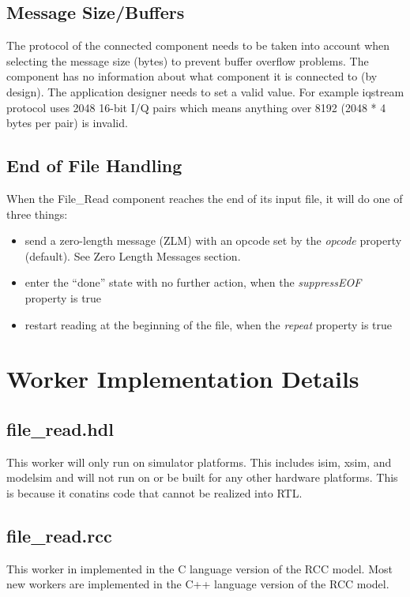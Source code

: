 \documentclass{article}
\def\comp{file\_read}
\begin{document}
\begin{flushleft}
\subsection*{Message Size/Buffers}
The protocol of the connected component needs to be taken into account when selecting the message size (bytes) to prevent buffer overflow problems.  The component has no information about what component it is connected to (by design). The application designer needs to set a valid value.  For example iqstream protocol uses 2048 16-bit I/Q pairs which means anything over 8192 (2048 * 4 bytes per pair) is invalid.  
\subsection*{End of File Handling}
When the File\_Read component reaches the end of its input file, it will do one of three
things:
\begin{itemize}
  \item send a zero-length message (ZLM) with an opcode set by the \textit{opcode} property (default).  See Zero Length Messages section.  
  \item enter the “done” state with no further action, when the \textit{suppressEOF} property
is true
  \item restart reading at the beginning of the file, when the \textit{repeat} property is true
\end{itemize}
    
\end{flushleft}

\section*{Worker Implementation Details}
\subsection*{\comp.hdl}
\begin{flushleft}
This worker will only run on simulator platforms.  This includes isim, xsim, and modelsim and will not run on or be built for any other hardware platforms.  This is because it conatins code that cannot be realized into RTL.  
\end{flushleft}
\subsection*{\comp.rcc}
\begin{flushleft}
This worker in implemented in the C language version of the RCC model.  Most new workers are implemented in the C++ language version of the RCC model.
\end{flushleft}
\end{document}
